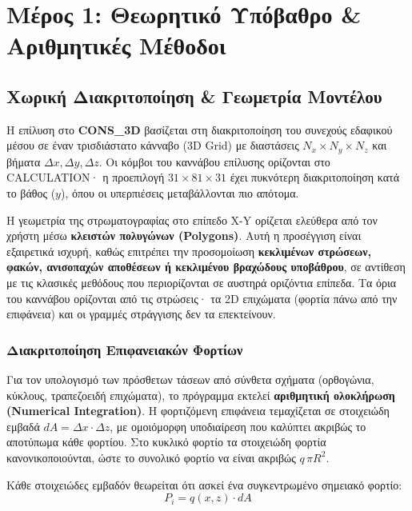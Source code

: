 \documentclass[11pt,a4paper]{article}
\newcommand{\cons}{\textbf{CONS\_3D}}
\begin{document}
\section{Μέρος 1: Θεωρητικό Υπόβαθρο \& Αριθμητικές Μέθοδοι}

\subsection{Χωρική Διακριτοποίηση \& Γεωμετρία Μοντέλου}

Η επίλυση στο \cons{} βασίζεται στη διακριτοποίηση του συνεχούς εδαφικού μέσου σε έναν τρισδιάστατο κάνναβο (3D Grid) με διαστάσεις $N_x \times N_y \times N_z$ και βήματα $\Delta x, \Delta y, \Delta z$. Οι κόμβοι του καννάβου επίλυσης ορίζονται στο CALCULATION· η προεπιλογή $31 \times 81 \times 31$ έχει πυκνότερη διακριτοποίηση κατά το βάθος ($y$), όπου οι υπερπιέσεις μεταβάλλονται πιο απότομα.

Η γεωμετρία της στρωματογραφίας στο επίπεδο X-Y ορίζεται ελεύθερα από τον χρήστη μέσω \textbf{κλειστών πολυγώνων (Polygons)}. Αυτή η προσέγγιση είναι εξαιρετικά ισχυρή, καθώς επιτρέπει την προσομοίωση \textbf{κεκλιμένων στρώσεων, φακών, ανισοπαχών αποθέσεων ή κεκλιμένου βραχώδους υποβάθρου}, σε αντίθεση με τις κλασικές μεθόδους που περιορίζονται σε αυστηρά οριζόντια επίπεδα. Τα όρια του καννάβου ορίζονται από τις στρώσεις· τα 2D επιχώματα (φορτία πάνω από την επιφάνεια) και οι γραμμές στράγγισης δεν τα επεκτείνουν.

\subsubsection{Διακριτοποίηση Επιφανειακών Φορτίων}

Για τον υπολογισμό των πρόσθετων τάσεων από σύνθετα σχήματα (ορθογώνια, κύκλους, τραπεζοειδή επιχώματα), το πρόγραμμα εκτελεί \textbf{αριθμητική ολοκλήρωση (Numerical Integration)}. Η φορτιζόμενη επιφάνεια τεμαχίζεται σε στοιχειώδη εμβαδά $dA = \Delta x \cdot \Delta z$, με ομοιόμορφη υποδιαίρεση που καλύπτει ακριβώς το αποτύπωμα κάθε φορτίου. Στο κυκλικό φορτίο τα στοιχειώδη φορτία κανονικοποιούνται, ώστε το συνολικό φορτίο να είναι ακριβώς $q\,\pi R^2$.

Κάθε στοιχειώδες εμβαδόν θεωρείται ότι ασκεί ένα συγκεντρωμένο σημειακό φορτίο:
\begin{equation}
  P_i = q(x,z)\cdot dA
\end{equation}
\end{document}
